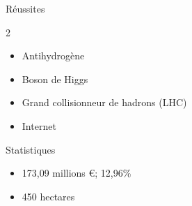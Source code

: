 \documentclass[aspectratio=43]{beamer}
\begin{document}
\begin{frame}{Réussites}
	\begin{multicols}{2}
		\begin{itemize}
			\item Antihydrogène 

			\item Boson de Higgs \cite{20121}

			\item Grand collisionneur de hadrons (LHC) 

			\item Internet 
		\end{itemize}

		\columnbreak

		\center
		
	\end{multicols}
\end{frame}



\begin{frame}{Statistiques}
	\begin{itemize}
		\item 173,09 millions €; 12,96\% 

		\item 450 hectares 
	\end{itemize}
\end{frame}
\end{document}
